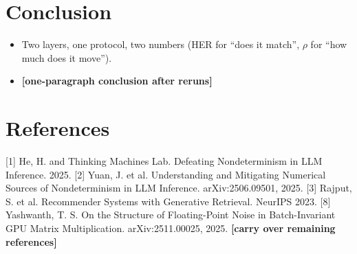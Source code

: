 \documentclass{article}
\newcommand{\todo}[1]{\textcolor{sTwo}{\textbf{[#1]}}}
\begin{document}
\section{Conclusion}
\begin{itemize}
  \item Two layers, one protocol, two numbers (HER for ``does it match'', $\rho$ for ``how much does it move'').
  \item \todo{one-paragraph conclusion after reruns}
\end{itemize}

\section*{References}
\small
[1] He, H. and Thinking Machines Lab. Defeating Nondeterminism in LLM Inference. 2025.
[2] Yuan, J. et al. Understanding and Mitigating Numerical Sources of Nondeterminism in LLM Inference. arXiv:2506.09501, 2025.
[3] Rajput, S. et al. Recommender Systems with Generative Retrieval. NeurIPS 2023.
[8] Yashwanth, T. S. On the Structure of Floating-Point Noise in Batch-Invariant GPU Matrix Multiplication. arXiv:2511.00025, 2025.
\todo{carry over remaining references}
\normalsize

\appendix
\end{document}
